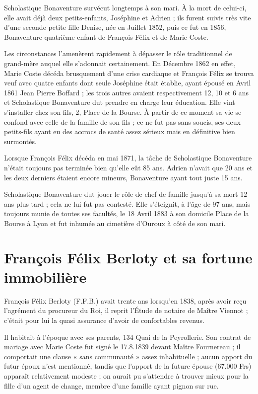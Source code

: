 \documentclass[11pt,a4paper]{report}
\begin{document}
Scholastique Bonaventure survécut longtemps à son mari. À la mort de celui-ci, elle avait déjà deux petits-enfants, Joséphine et Adrien ; ils furent suivis très vite d'une seconde petite fille Denise, née en Juillet 1852, puis ce fut en 1856, Bonaventure quatrième enfant de François Félix et de Marie Coste.


Les circonstances l'amenèrent rapidement à dépasser le rôle traditionnel de grand-mère auquel elle s'adonnait certainement. En Décembre 1862 en effet, Marie Coste décéda brusquement d'une crise cardiaque et François Félix se trouva veuf avec quatre enfants dont seule Joséphine était établie, ayant épousé en Avril 1861 Jean Pierre Boffard ; les trois autres avaient respectivement 12, 10 et 6 ans et Scholastique Bonaventure dut prendre en charge leur éducation. Elle vint s'installer chez son fils, 2, Place de la Bourse. À partir de ce moment sa vie se confond avec celle de la famille de son fils ; ce ne fut pas sans soucis, ses deux petits-fils ayant eu des accrocs de santé assez sérieux mais en définitive bien surmontés.

Lorsque François Félix décéda en mai 1871, la tâche de Scholastique Bonaventure n'était toujours pas terminée bien qu'elle eût 85 ans. Adrien n'avait que 20 ans et les deux derniers étaient encore mineurs, Bonaventure ayant tout juste 15 ans.

Scholastique Bonaventure dut jouer le rôle de chef de famille jusqu'à sa mort 12 ans plus tard ; cela ne lui fut pas contesté. Elle s'éteignit, à l'âge de 97 ans, mais toujours munie de toutes ses facultés, le 18 Avril 1883 à son domicile Place de la Bourse à Lyon et fut inhumée au cimetière d'Ouroux à côté de son mari.

\chapter{François Félix Berloty et sa fortune immobilière}\label{franuxe7ois-fuxe9lix-berloty-et-sa-fortune-immobiliuxe8re}

François Félix Berloty (F.F.B.) avait trente ans lorsqu'en 1838, après avoir reçu l'agrément du procureur du Roi, il reprit l'Étude de notaire de Maître Viennot ; c'était pour lui la quasi assurance d'avoir de confortables revenus.

Il habitait à l'époque avec ses parents, 134 Quai de la Peyrollerie. Son contrat de mariage avec Marie Coste fut signé le 17.8.1839 devant Maître Fournereau ; il comportait une clause « sans communauté » assez inhabituelle ; aucun apport du futur époux n'est mentionné, tandis que l'apport de la future épouse (67.000 Frs) apparaît relativement modeste ; on aurait pu s'attendre à trouver mieux pour la fille d'un agent de change, membre d'une famille ayant pignon sur rue.
\end{document}
